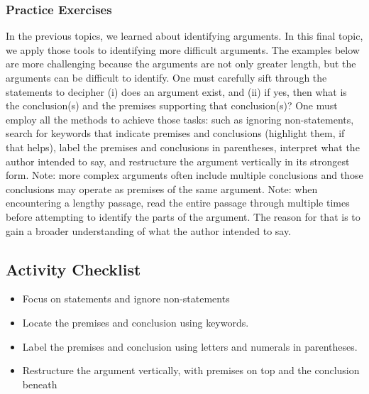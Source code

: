 \documentclass[
]{book}
\begin{document}
\hypertarget{practice-exercises-2}{%
\subsubsection*{Practice Exercises}\label{practice-exercises-2}}

In the previous topics, we learned about identifying arguments. In this final topic, we apply those tools to identifying more difficult arguments. The examples below are more challenging because the arguments are not only greater length, but the arguments can be difficult to identify. One must carefully sift through the statements to decipher (i) does an argument exist, and (ii) if yes, then what is the conclusion(s) and the premises supporting that conclusion(s)? One must employ all the methods to achieve those tasks: such as ignoring non-statements, search for keywords that indicate premises and conclusions (highlight them, if that helps), label the premises and conclusions in parentheses, interpret what the author intended to say, and restructure the argument vertically in its strongest form. Note: more complex arguments often include multiple conclusions and those conclusions may operate as premises of the same argument. Note: when encountering a lengthy passage, read the entire passage through multiple times before attempting to identify the parts of the argument. The reason for that is to gain a broader understanding of what the author intended to say.

\hypertarget{activity-checklist-4}{%
\subsection*{Activity Checklist}\label{activity-checklist-4}}

\begin{reflect}
\begin{itemize}
\item
  Focus on statements and ignore non-statements
\item
  Locate the premises and conclusion using keywords.
\item
  Label the premises and conclusion using letters and numerals in parentheses.
\item
  Restructure the argument vertically, with premises on top and the conclusion beneath
\end{itemize}
\end{reflect}
\end{document}
